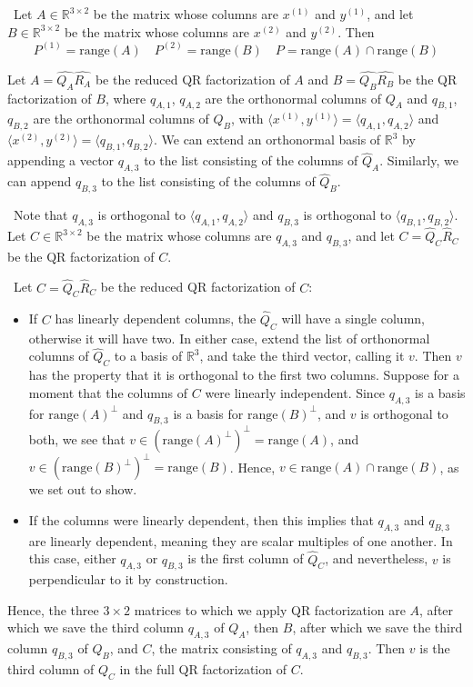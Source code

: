 \documentclass[12pt]{article}
\newenvironment{sol}[1][Solution]{\begin{trivlist}
		\item[\hskip \labelsep {\bfseries #1:}]}{\end{trivlist}}
\begin{document}
\begin{sol}
	\
	Let $A\in\mathbb{R}^{3\times 2}$ be the matrix whose columns are $x^{(1)}$ and $y^{(1)}$, and let
	$B\in\mathbb{R}^{3\times 2}$ be the matrix whose columns are $x^{(2)}$ and $y^{(2)}$. Then
	\[
	P^{(1)}=\text{range}(A)\quad
	P^{(2)}=\text{range}(B)\quad
	P=\text{range}(A)\cap \text{range}(B)
	\]
	
	
	Let $A=\hat{Q_A}\hat{R_A}$ be the reduced QR factorization of $A$ and $B=\hat{Q_B}\hat{R_B}$ be the
	QR factorization of $B$, where $q_{A,1}$, $q_{A,2}$ are the orthonormal columns of $Q_A$ and
	$q_{B,1}$, $q_{B,2}$ are the orthonormal columns of $Q_B$, with $\langle x^{(1)},y^{(1)}\rangle=\langle q_{A,1},q_{A,2}\rangle$ and $\langle x^{(2)},y^{(2)}\rangle=\langle q_{B,1},q_{B,2}\rangle$.
	We can extend an orthonormal basis of $\mathbb{R}^3$ by appending a vector $q_{A,3}$ to the
	list consisting of the columns of $\hat{Q}_A$. Similarly, we can append $q_{B,3}$ to the
	list consisting of the columns of $\hat{Q}_B$.
	
	\
	Note that $q_{A,3}$ is orthogonal to $\langle q_{A,1}, q_{A,2}\rangle$ and $q_{B,3}$ is orthogonal to
	$\langle q_{B,1},q_{B,2}\rangle$. Let $C\in\mathbb{R}^{3\times 2}$ be the matrix whose columns are $q_{A,3}$
	and $q_{B,3}$, and let $C=\hat{Q}_C\hat{R}_C$ be the QR factorization of $C$.
	
	\
	Let $C=\hat{Q}_C\hat{R}_C$ be the reduced QR factorization of $C$:
	\begin{itemize}
		\item  If $C$ has linearly dependent columns,
		the $\hat{Q}_C$ will have a single column, otherwise it will have two. In either case, extend the
		list of orthonormal columns of $\hat{Q}_C$ to a basis of $\mathbb{R}^3$, and take the third vector,
		calling it $v$. Then $v$ has the property that it is orthogonal to the first two columns. Suppose
		for a moment that the columns of $C$ were linearly independent. Since $q_{A,3}$ is a basis for
		$\text{range}(A)^\perp$ and $q_{B,3}$ is a basis for $\text{range}(B)^\perp$, and $v$ is orthogonal
		to both, we see that $v\in (\text{range}(A)^\perp)^\perp=\text{range}(A)$, and
		$v\in (\text{range}(B)^\perp)^\perp=\text{range}(B)$. Hence, $v\in \text{range}(A)\cap \text{range}(B)$,
		as we set out to show.
		\item If the columns were linearly dependent, then this implies that
		$q_{A,3}$ and $q_{B,3}$ are linearly dependent, meaning they are scalar multiples of one another.
		In this case, either $q_{A,3}$ or $q_{B,3}$ is the first column of $\hat{Q}_C$, and nevertheless,
		$v$ is perpendicular to it by construction.
	\end{itemize}
	Hence, the three $3\times 2$ matrices to which we apply QR factorization are $A$, after which we save
	the third column $q_{A,3}$ of $Q_A$, then $B$, after which we save the third column $q_{B,3}$ of $Q_B$,
	and $C$, the matrix consisting of $q_{A,3}$ and $q_{B,3}$. Then $v$ is the third column of $Q_C$ in
	the full QR factorization of $C$.
\end{sol}
\end{document}
